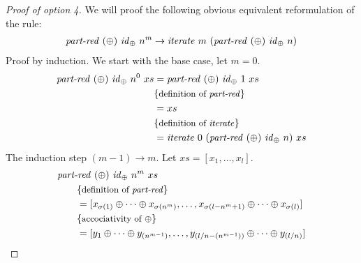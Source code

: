 \begin{proof}[Proof of option 4]
  We will proof the following obvious equivalent reformulation of the rule:
  \begin{align*}
    \text{\textit{part-red}}\ (\oplus)\ \text{\textit{id}}_\oplus\ n^m \rightarrow \text{\textit{iterate}}\ m\ (\text{\textit{part-red}}\ (\oplus)\ \text{\textit{id}}_\oplus\ n)
  \end{align*}
  Proof by induction. We start with the base case, let $m= 0$.
  \begin{align*}
    \text{\textit{part-red}}\ (\oplus)\ \text{\textit{id}}_\oplus\ n^0\ xs &= \text{\textit{part-red}}\ (\oplus)\ \text{\textit{id}}_\oplus\ 1\ xs\\
      & \{\text{\small definition of \text{\textit{part-red}}}\}\\
      &= xs\\
      &\{\text{\small definition of \text{\textit{iterate}}}\}\\
      &= \text{\textit{iterate}}\ 0\ (\text{\textit{part-red}}\ (\oplus)\ \text{\textit{id}}_\oplus\ n)\ xs\\
  \end{align*}
  The induction step $(m-1) \rightarrow m$.
  Let $xs = [x_1, \ldots, x_l]$.
  \begin{align*}
    &\partRed\ (\oplus)\ \id_\oplus\ n^m\ xs\\
    &\qquad \comment{definition of \partRed}\\
    &\qquad = [x_{\sigma(1)} \oplus \dots \oplus x_{\sigma(n^m)}, \ldots, x_{\sigma(l-n^m+1)} \oplus \dots \oplus x_{\sigma(l)}]\\
    &\qquad \comment{accociativity of $\oplus$}\\
    &\qquad = [y_1 \oplus \dots \oplus y_{(n^{m-1})}, \ldots, y_{(l/n - (n^{m-1}))} \oplus \dots \oplus y_{(l/n)}]\\

\end{align*}
\end{proof}
